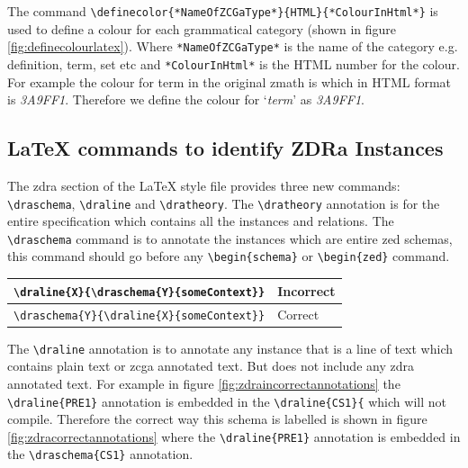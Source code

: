 The command \verb|\definecolor{*NameOfZCGaType*}{HTML}{*ColourInHtml*}| is used
to define a colour for each grammatical category (shown in figure
\ref{fig:definecolourlatex}). Where \verb|*NameOfZCGaType*| is the name of the
category e.g. definition, term, set etc and \verb|*ColourInHtml*| is the HTML
number for the colour. For example the colour for term in the original
\gls{zmath} is  which in HTML format is \emph{3A9FF1}.
Therefore we define the colour for `\emph{term}' as \emph{3A9FF1}.

\subsection{\LaTeX{} commands to identify ZDRa Instances}

The \gls{zdra} section of the \LaTeX{} style file provides three new commands:
\verb|\draschema|, \verb|\draline| and \verb|\dratheory|. The \verb|\dratheory|
annotation is for the entire specification which contains all the instances and
relations. The \verb|\draschema| command is to annotate the instances which are
entire zed schemas, this command should go before any \verb|\begin{schema}| or
\verb|\begin{zed}| command.

\begin{tabular}{|l | l|}
\hline
\verb|\draline{X}{\draschema{Y}{someContext}}| & {\color{set}Incorrect} \\
\hline
\verb|\draschema{Y}{\draline{X}{someContext}}| & {\color{set}Correct} \\
\hline
\end{tabular}

 The \verb|\draline| annotation is to annotate any instance that is a line of
 text which contains plain text or \gls{zcga} annotated text. But does not
 include any \gls{zdra} annotated text. For example in figure
 \ref{fig:zdraincorrectannotations} the \verb|\draline{PRE1}| annotation is
 embedded in the \verb|\draline{CS1}{| which will not compile. Therefore the
 correct way this schema is labelled is shown in figure
 \ref{fig:zdracorrectannotations} where the \verb|\draline{PRE1}| annotation is
 embedded in the \verb|\draschema{CS1}| annotation.


